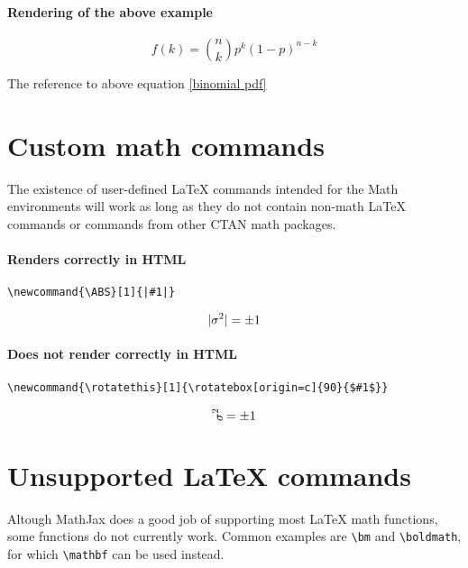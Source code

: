 \paragraph{Rendering of the above example}
\begin{equation}\label{binomial pdf}
  f\left(k\right) = \binom{n}{k} p^k\left(1-p\right)^{n-k}
\end{equation}

The reference to above equation \eqref{binomial pdf}



\section{Custom math commands}

The existence of user-defined LaTeX commands intended for the Math environments will work as long as they do not contain non-math LaTeX commands or commands from other CTAN math packages.

\paragraph{Renders correctly in HTML}

\begin{verbatim}
\newcommand{\ABS}[1]{|#1|}
\end{verbatim}

$$ \ABS{\sigma^2} = \pm 1 $$

\paragraph{Does not render correctly in HTML}


\begin{verbatim}
\newcommand{\rotatethis}[1]{\rotatebox[origin=c]{90}{$#1$}}
\end{verbatim}

$$ \rotatethis{\sigma^2} = \pm 1 $$



\section{Unsupported LaTeX commands}

Altough MathJax does a good job of supporting most LaTeX math functions,
some functions do not currently work. Common examples are \verb|\bm| and \verb|\boldmath|, for which \verb|\mathbf| can be used instead.





